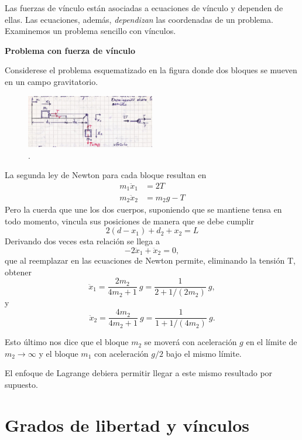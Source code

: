 \documentclass[10pt,oneside]{CBFT_book}
\begin{document}
Las fuerzas de vínculo están asociadas a ecuaciones de vínculo y dependen de ellas. Las ecuaciones, además, {\it 
dependizan} las coordenadas de un problema. Examinemos un problema sencillo con vínculos.

\begin{ejemplo}{\bfseries Problema con fuerza de vínculo }

\label{problema_fuerza_vinculo}
Considerese el problema esquematizado en la figura donde dos bloques se mueven en un campo gravitatorio.
\begin{figure}[!ht]
	\centering
	\includegraphics[width=0.5\textwidth]{images/fig_mc_problema_bloques.jpg}	
	\caption{.}
	\label{fig_mc_problema_bloques}
\end{figure} 
La segunda ley de Newton para cada bloque resultan en
\begin{align*}
	m_1 \ddot{x}_1 &= 2T \\
	m_2 \ddot{x}_2 &= m_2 g - T
\end{align*}
Pero la cuerda que une los dos cuerpos, suponiendo que se mantiene tensa en todo momento, vincula sus posiciones de 
manera que se debe cumplir 
\[
	2(d-x_1) + d_2 + x_2 = L
\]
Derivando dos veces esta relación se llega a
\[
	- 2\ddot{x}_1 + \ddot{x}_2 = 0,
\]
que al reemplazar en las ecuaciones de Newton permite, eliminando la tensión T, obtener
\[
	\ddot{x}_1 = \frac{2 m_2}{4m_2 + 1} \: g = \frac{1}{2 + 1/(2m_2)} \: g ,
\]
y
\[
	\ddot{x}_2 = \frac{4 m_2}{4m_2 + 1} \: g = \frac{1}{1 + 1/(4m_2)} \: g.
\]

Esto último nos dice que el bloque $m_2$ se moverá con aceleración $g$ en el límite de $m_2 \to \infty$ y el bloque
$m_1$ con aceleración $g/2$ bajo el mismo límite. 
\end{ejemplo}

El enfoque de Lagrange debiera permitir llegar a este mismo resultado por supuesto.


\section{Grados de libertad y vínculos}
\end{document}
